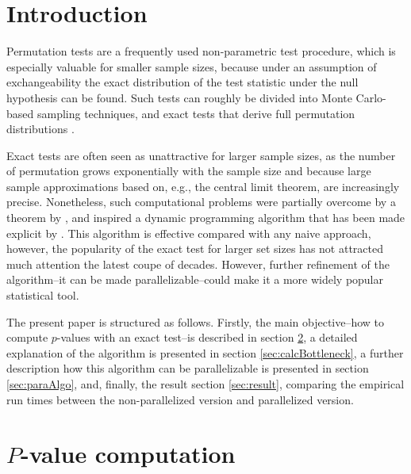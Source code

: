 \documentclass[a4paper,11pt]{article}
\begin{document}
\section{Introduction}
Permutation tests are a frequently used non-parametric test procedure, which is especially valuable for smaller sample sizes, because under an assumption of exchangeability the exact distribution of the test statistic under the null hypothesis can be found. Such tests can roughly be divided into Monte Carlo-based sampling techniques\cite{segal2018fast}, and exact tests that derive full permutation distributions .

Exact tests are often seen as unattractive for larger sample sizes, as the number of permutation grows exponentially with the sample size and because large sample approximations based on, e.g., the central limit theorem, are increasingly precise. Nonetheless, such computational problems were partially overcome by a theorem by \cite{pagano_trichtler1983}, and inspired a dynamic programming algorithm that has been made explicit by \cite{zimmermann1985}. This algorithm is effective compared with any naive approach, however, the popularity of the exact test for larger set sizes has not attracted much attention the latest coupe of decades. However, further refinement of the algorithm–it can be made parallelizable–could make it a more widely popular statistical tool.

The present paper is structured as follows. Firstly, the main objective–how to compute $p$-values with an exact test–is described in section \ref{sec:PvalueComputation}, a detailed explanation of the algorithm is presented in section \ref{sec:calcBottleneck}, a further description how this algorithm can be parallelizable is presented in section \ref{sec:paraAlgo}, and, finally, the result section \ref{sec:result}, comparing the empirical run times between the non-parallelized version and parallelized version.

\section{$P$-value computation}
\label{sec:PvalueComputation}
\end{document}
